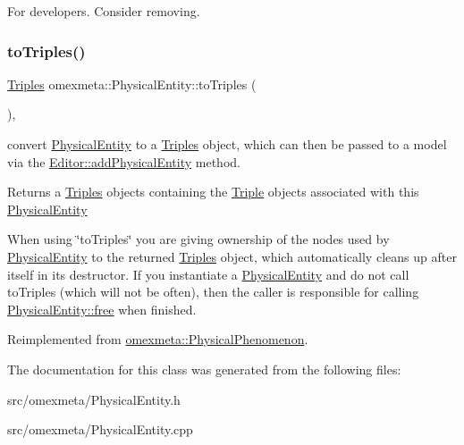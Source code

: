For developers. Consider removing. \mbox{\label{classomexmeta_1_1PhysicalEntity_a51f5df8b2e8a1d65e5aa0d10e53b77ba}} 
\subsubsection{\texorpdfstring{to\+Triples()}{toTriples()}}
{\footnotesize\ttfamily \hyperlink{classomexmeta_1_1Triples}{Triples} omexmeta\+::\+Physical\+Entity\+::to\+Triples (\begin{DoxyParamCaption}{ }\end{DoxyParamCaption})\hspace{0.3cm}{\ttfamily [override]}, {\ttfamily [virtual]}}



convert \hyperlink{classomexmeta_1_1PhysicalEntity}{Physical\+Entity} to a \hyperlink{classomexmeta_1_1Triples}{Triples} object, which can then be passed to a model via the \hyperlink{classomexmeta_1_1Editor_a0740831baafe244374ad7a324d51a87e}{Editor\+::add\+Physical\+Entity} method. 

\begin{DoxyReturn}{Returns}
a \hyperlink{classomexmeta_1_1Triples}{Triples} objects containing the \hyperlink{classomexmeta_1_1Triple}{Triple} objects associated with this \hyperlink{classomexmeta_1_1PhysicalEntity}{Physical\+Entity}
\end{DoxyReturn}
When using \char`\"{}to\+Triples\char`\"{} you are giving ownership of the nodes used by \hyperlink{classomexmeta_1_1PhysicalEntity}{Physical\+Entity} to the returned \hyperlink{classomexmeta_1_1Triples}{Triples} object, which automatically cleans up after itself in its destructor. If you instantiate a \hyperlink{classomexmeta_1_1PhysicalEntity}{Physical\+Entity} and do not call to\+Triples (which will not be often), then the caller is responsible for calling \hyperlink{classomexmeta_1_1PhysicalEntity_a6fd4acd7255a01322c4a53d3e84df0ba}{Physical\+Entity\+::free} when finished. 

Reimplemented from \hyperlink{classomexmeta_1_1PhysicalPhenomenon_a30617e685bd8b155a76d38ab5a9db273}{omexmeta\+::\+Physical\+Phenomenon}.



The documentation for this class was generated from the following files\+:\begin{DoxyCompactItemize}
\item 
src/omexmeta/Physical\+Entity.\+h\item 
src/omexmeta/Physical\+Entity.\+cpp\end{DoxyCompactItemize}
